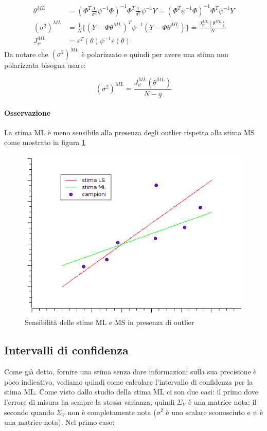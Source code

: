   \begin{align*}
    \theta^{ML}&=(\Phi^T\frac{1}{\sigma^2}\psi^{-1}\Phi)^{-1}\Phi^T\frac{1}{\sigma^2}\psi^{-1}Y  =(\Phi^T\psi^{-1}\Phi)^{-1}\Phi^T\psi^{-1}Y  \\
    (\sigma^2)^{ML}&=\frac{1}{N}\{ (Y-\Phi\theta^{ML})^T\psi^{-1}(Y-\Phi\theta^{ML})\}=\frac{J_\psi^{ML}(\theta^{ML})}{N}\\
    J_\psi^{ML}&=\varepsilon ^T(\theta)\psi^{-1}\varepsilon (\theta)
  \end{align*} %
Da notare che $(\sigma^2)^{ML}$ è polarizzato e quindi per avere una stima non polarizzata bisogna usare:

  \[ (\sigma^2)^{ML}=\frac{J_\psi^{ML}(\theta^{ML})}{N-q} \]
  
\paragraph{Osservazione} La stima ML è meno sensibile alla presenza degli outlier rispetto alla stima MS come mostrato in figura \ref{fig:MLMSoutlier}

\begin{figure}[htbp]
  \centering
  \includegraphics[scale=0.5]{img/outlier.png}
  \caption{Sensibilità delle stime ML e MS in presenza di outlier\label{fig:MLMSoutlier}}
\end{figure}

\subsection{Intervalli di confidenza}
Come già detto, fornire una stima senza dare informazioni sulla sua precisione è poco indicativo, vediamo quindi come calcolare l'intervallo di confidenza per la stima ML. Come visto dallo studio della stima ML ci son due casi: il primo dove l'errore di misura ha sempre la stessa varianza, quindi $\Sigma_V$ è una matrice nota; il secondo quando $\Sigma_V$ non è completamente nota ($\sigma^2$ è uno scalare sconosciuto e $\psi$ è una matrice nota).
Nel primo caso:

